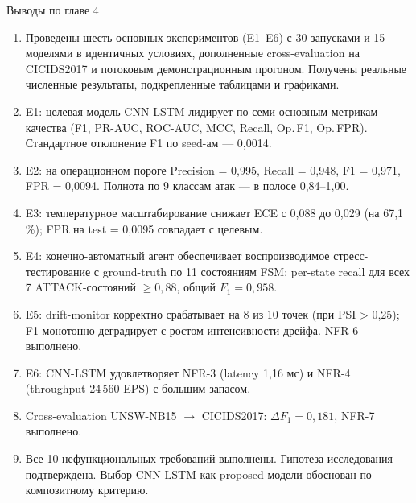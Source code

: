 \noindent Выводы по главе 4

\begin{enumerate}
    \item Проведены шесть основных экспериментов (E1--E6) с 30
    запусками и 15 моделями в идентичных условиях, дополненные
    cross-evaluation на CICIDS2017 и потоковым демонстрационным
    прогоном. Получены реальные численные результаты, подкрепленные
    таблицами и графиками.
    \item E1: целевая модель CNN-LSTM лидирует по семи основным
    метрикам качества (F1, PR-AUC, ROC-AUC, MCC, Recall, Op.\,F1,
    Op.\,FPR). Стандартное отклонение F1 по seed-ам --- 0,0014.
    \item E2: на операционном пороге Precision = 0,995,
    Recall = 0,948, F1 = 0,971, FPR = 0,0094. Полнота по 9 классам
    атак --- в полосе 0,84--1,00.
    \item E3: температурное масштабирование снижает ECE с 0,088 до
    0,029 (на 67,1\,\%); FPR на test = 0,0095 совпадает с целевым.
    \item E4: конечно-автоматный агент обеспечивает воспроизводимое
    стресс-тестирование с ground-truth по 11 состояниям FSM;
    per-state recall для всех 7 ATTACK-состояний $\geq 0{,}88$,
    общий $F_1 = 0{,}958$.
    \item E5: drift-monitor корректно срабатывает на 8 из 10 точек
    (при PSI > 0,25); F1 монотонно деградирует с ростом
    интенсивности дрейфа. NFR-6 выполнено.
    \item E6: CNN-LSTM удовлетворяет NFR-3 (latency 1,16 мс) и
    NFR-4 (throughput 24\,560 EPS) с большим запасом.
    \item Cross-evaluation UNSW-NB15 $\to$ CICIDS2017:
    $\Delta F_1 = 0{,}181$, NFR-7 выполнено.
    \item Все 10 нефункциональных требований выполнены. Гипотеза
    исследования подтверждена. Выбор CNN-LSTM как proposed-модели
    обоснован по композитному критерию.
\end{enumerate}
